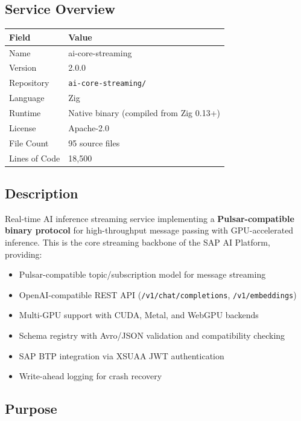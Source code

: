 \documentclass[11pt,a4paper]{article}
\begin{document}
\subsection{Service Overview}

\begin{tabular}{@{}L{4cm}L{10cm}@{}}
\toprule
\textbf{Field} & \textbf{Value} \\
\midrule
Name & ai-core-streaming \\
Version & 2.0.0 \\
Repository & \texttt{ai-core-streaming/} \\
Language & Zig \\
Runtime & Native binary (compiled from Zig 0.13+) \\
License & Apache-2.0 \\
File Count & 95 source files \\
Lines of Code & 18,500 \\
\bottomrule
\end{tabular}

\subsection{Description}

Real-time AI inference streaming service implementing a \textbf{Pulsar-compatible binary protocol} for high-throughput message passing with GPU-accelerated inference. This is the core streaming backbone of the SAP AI Platform, providing:

\begin{itemize}[noitemsep]
    \item Pulsar-compatible topic/subscription model for message streaming
    \item OpenAI-compatible REST API (\texttt{/v1/chat/completions}, \texttt{/v1/embeddings})
    \item Multi-GPU support with CUDA, Metal, and WebGPU backends
    \item Schema registry with Avro/JSON validation and compatibility checking
    \item SAP BTP integration via XSUAA JWT authentication
    \item Write-ahead logging for crash recovery
\end{itemize}

\subsection{Purpose}
\end{document}
